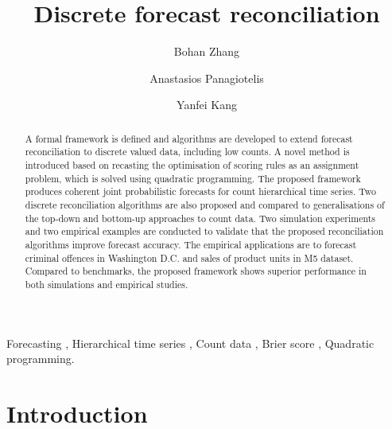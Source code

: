 \documentclass[a4paper,review,12pt,authoryear]{elsarticle}
\theoremstyle{definition}
\begin{document}
\begin{frontmatter}

  \title{Discrete forecast reconciliation}

  \author[label1]{Bohan Zhang}
  \address[label1]{School of Economics and Management, Beihang University, Beijing, China}
  \author[label2]{Anastasios Panagiotelis}

  \author[label1]{Yanfei Kang}
  \address[label2]{The University of Sydney Business School, NSW 2006, Australia}

  \begin{abstract}

    A formal framework is defined and algorithms are developed to extend forecast reconciliation to discrete valued data, including low counts. A novel method is introduced based on recasting the optimisation of scoring rules as an assignment problem, which is solved using quadratic programming. The proposed framework produces coherent joint probabilistic forecasts for count hierarchical time series.
    Two discrete reconciliation algorithms are also proposed and compared to generalisations of the top-down and bottom-up approaches to count data. Two simulation experiments and two empirical examples are conducted to validate that the proposed reconciliation algorithms improve forecast accuracy. The empirical applications are to forecast criminal offences in Washington D.C. and sales of product units in M5 dataset. Compared to benchmarks, the proposed framework shows superior performance in both simulations and empirical studies.

  \end{abstract}

  \begin{keyword}
  Forecasting \sep
  Hierarchical time series \sep
  Count data \sep
  Brier score \sep
  Quadratic programming.
  \end{keyword}

\end{frontmatter}

\newpage
\linenumbers

\section{Introduction}
\end{document}
